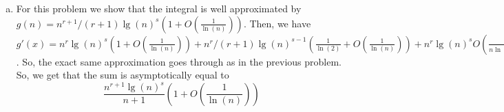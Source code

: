 \documentclass{article}
\begin{document}
\begin{enumerate}[a.]
\begin{align*}
g(x) & = \int_1^x \lg(x)^s ( 1+ O(1/\ln(x))) dx\\
&=\int_1^x \lg(x)^s dx +  \int_1^x O(\ln(x)^{r-1})) dx\\
&=\int_1^x \lg(x)^s dx +   O(x\ln(x)^{r-1}))\\
\end{align*}
but this second term is insignificant enough to be absorbed into our $f(x)$ in how we defined $g(x)$. Then, since we can bound the sum above and below by the integral, just with shifted endpoints, and the derivative of the main term of the integral is small enough to fit in the remainder term, shifting it by one will not cause it's value to change asymptotically. So, we have that the sum is $ n \ln(n)^s( \frac{1}{\ln(2)^s}+ O(\frac{1}{\ln(n)})) =  n \lg(n)^s( 1+ O(\frac{1}{\ln(n)})$ which is asymptotically tight.
\item
For this problem we show that the integral is well approximated by $g(n) = n^{r+1}/(r+1) \lg(n)^s ( 1 + O(\frac{1}{\ln(n)}))$. Then, we have $g'(x) = n^r \lg(n)^s ( 1 + O(\frac{1}{\ln(n)})) + n^{r}/(r+1)\lg(n)^{s-1} ( \frac{1}{\ln(2)} + O(\frac{1}{\ln(n)})) + n^r\lg(n)^s  O(\frac{1}{n\ln(n)^2})) =  n^r \lg(n)^s + O( n^r \lg(n)^{s-1})$. So, the exact same approximation goes through as in the previous problem. So, we get that the sum is asymptotically equal to 
\[
\frac{n^{r+1} \lg(n)^s}{n+1} \left(1 + O\left(\frac{1}{\ln(n)}\right)\right)
\]
\end{enumerate}
\end{document}
